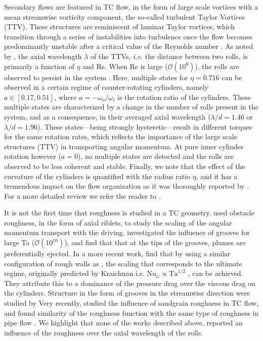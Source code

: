 Secondary flows are featured in TC flow, in the form of large scale vortices with a mean streamwise vorticity component, the so-called turbulent Taylor Vortices (TTV). These structures are reminiscent of laminar Taylor vortices, which transition through a series of instabilities into turbulence once the flow becomes predominantly unstable after a critical value of the Reynolds number \citep{Taylor1923b}. As noted by \citet{Chouippe2014}, the axial wavelength $\lambda$ of the TTVs, \textit{i.e.} the distance between two rolls, is primarily a function of $\eta$ and $\text{Re}$. When $\text{Re}$ is large ($\mathcal{O}(10^6)$), the rolls are observed to persist in the system \citep{Huisman2014}. Here, multiple states for $\eta=0.716$ can be observed in a certain regime of counter-rotating cylinders, namely $a\in[0.17,0.51]$, where $a=-\omega_o/\omega_i$ is the rotation ratio of the cylinders. These multiple states are characterized by a change in the number of rolls present in the system, and as a consequence, in their averaged axial wavelength ($\lambda/d = 1.46$ or $\lambda/d = 1.96$). These states---being strongly hysteretic---result in different torques for the same rotation rates, which reflects the importance of the large scale structures (TTV) in transporting angular momentum. At pure inner cylinder rotation however ($a=0$), no multiple states are detected and the rolls are observed to be less coherent and stable. Finally, we note that the effect of the curvature of the cylinders is quantified with the radius ratio $\eta$, and it has a tremendous impact on the flow organization as it was thoroughly reported by \citet{Ostilla-Monico2014c,Ostilla-Monico2014}. For a more detailed review we refer the reader to \citet{Andereck1986,Grossmann2016}.

It is not the first time that roughness is studied in a TC geometry. \citet{Cadot1997, vandenBerg2003} used obstacle roughness, in the form of axial riblets, to study the scaling of the angular momentum transport with the driving.
\citet{Zhu2016} investigated the influence of grooves for large Ta ($\mathcal{O}(10^{10})$), and find that that at the tips of the grooves, plumes are preferentially ejected. In a more recent work, \citet{Zhu2018} find that by using a similar configuration of rough walls as \citet{vandenBerg2003}, the scaling that corresponds to the ultimate regime, originally predicted by Kraichnan i.e. $\text{Nu}_\omega \propto \text{Ta}^{1/2}$ \citep{Kraichnan1962}, can be achieved. They attribute this to a dominance of the pressure drag over the viscous drag on the cylinders.
Structure in the form of grooves in the streamwise direction were studied by 
Very recently, \cite{Berghout2018} studied the influence of sandgrain roughness in TC flow, and found similarity of the roughness function with the same type of roughness in pipe flow \cite{Nikuradse1933}. We highlight that none of the works described above, reported an influence of the roughness over the axial wavelength of the rolls.

